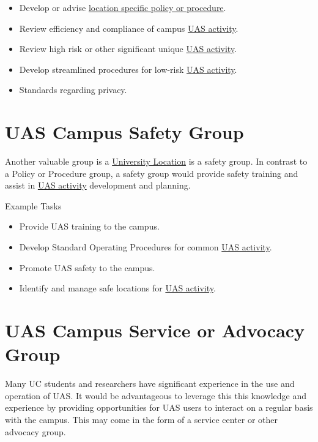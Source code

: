 \documentclass[
]{book}
\providecommand{\tightlist}{%
  \setlength{\itemsep}{0pt}\setlength{\parskip}{0pt}}
\begin{document}
\begin{itemize}
\tightlist
\item
  Develop or advise \protect\hyperlink{LSP}{location specific policy or procedure}.
\item
  Review efficiency and compliance of campus \protect\hyperlink{UASactivity}{UAS activity}.
\item
  Review high risk or other significant unique \protect\hyperlink{UASactivity}{UAS activity}.
\item
  Develop streamlined procedures for low-risk \protect\hyperlink{UASactivity}{UAS activity}.
\item
  Standards regarding privacy.
\end{itemize}

\hypertarget{uas-campus-safety-group}{%
\section{UAS Campus Safety Group}\label{uas-campus-safety-group}}

Another valuable group is a \protect\hyperlink{UL}{University Location} is a safety group. In contrast to a Policy or Procedure group, a safety group would provide safety training and assist in \protect\hyperlink{UASactivity}{UAS activity} development and planning.

Example Tasks

\begin{itemize}
\tightlist
\item
  Provide UAS training to the campus.
\item
  Develop Standard Operating Procedures for common \protect\hyperlink{UASactivity}{UAS activity}.
\item
  Promote UAS safety to the campus.
\item
  Identify and manage safe locations for \protect\hyperlink{UASactivity}{UAS activity}.
\end{itemize}

\hypertarget{uas-campus-service-or-advocacy-group}{%
\section{UAS Campus Service or Advocacy Group}\label{uas-campus-service-or-advocacy-group}}

Many UC students and researchers have significant experience in the use and operation of UAS. It would be advantageous to leverage this this knowledge and experience by providing opportunities for UAS users to interact on a regular basis with the campus. This may come in the form of a service center or other advocacy group.
\end{document}
